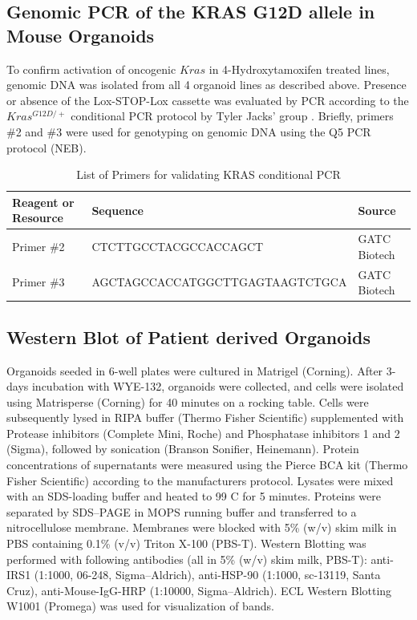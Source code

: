 \begin{flushleft}
\subsection{Genomic PCR of the KRAS G12D allele in Mouse Organoids}
To confirm activation of oncogenic $Kras$ in 4-Hydroxytamoxifen treated lines, genomic DNA was isolated from all 4 organoid lines as described above. Presence or absence of the Lox-STOP-Lox cassette was evaluated by PCR according to the $Kras^{G12D/+}$ conditional PCR protocol by Tyler Jacks’ group \parencite{jacksonAnalysisLungTumor2001}. Briefly, primers \#2 and \#3 were used for genotyping on genomic DNA using the Q5 PCR protocol (NEB).

\begin{table}[htb]
\caption{List of Primers for validating KRAS conditional PCR}
\label{tab:kras} %
\begin{tabularx}{\textwidth}{XlX}
\toprule
\textbf{Reagent or Resource} & \textbf{Sequence} & \textbf{Source} \\
\midrule
Primer \#2 & CTCTTGCCTACGCCACCAGCT & GATC Biotech \\
Primer \#3 & AGCTAGCCACCATGGCTTGAGTAAGTCTGCA & GATC Biotech \\
\bottomrule
\end{tabularx}
\end{table}

\subsection{Western Blot of Patient derived Organoids}
Organoids seeded in 6-well plates were cultured in Matrigel (Corning). After 3-days incubation with WYE-132, organoids were collected, and cells were isolated using Matrisperse (Corning) for 40 minutes on a rocking table. Cells were subsequently lysed in RIPA buffer (Thermo Fisher Scientific) supplemented with Protease inhibitors (Complete Mini, Roche) and Phosphatase inhibitors 1 and 2 (Sigma), followed by sonication (Branson Sonifier, Heinemann). Protein concentrations of supernatants were measured using the Pierce BCA kit (Thermo Fisher Scientific) according to the manufacturers protocol. Lysates were mixed with an SDS-loading buffer and heated to 99 C for 5 minutes. Proteins were separated by SDS–PAGE in MOPS running buffer and transferred to a nitrocellulose membrane. Membranes were blocked with 5\% (w/v) skim milk in PBS containing 0.1\% (v/v) Triton X-100 (PBS-T). Western Blotting was performed with following antibodies (all in 5\% (w/v) skim milk, PBS-T): anti-IRS1 (1:1000, 06-248, Sigma–Aldrich), anti-HSP-90 (1:1000, sc-13119, Santa Cruz), anti-Mouse-IgG-HRP (1:10000, Sigma–Aldrich). ECL Western Blotting W1001 (Promega) was used for visualization of bands.


\end{flushleft}
